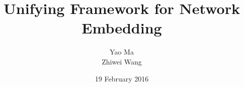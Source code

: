 \documentclass{sig-alternate-05-2015}
\begin{document}


\title{Unifying Framework for Network Embedding}

\author{
%
%
\alignauthor
Yao Ma\\
\alignauthor
Zhiwei Wang \\
}
\date{19 February 2016}

\maketitle
\end{document}
